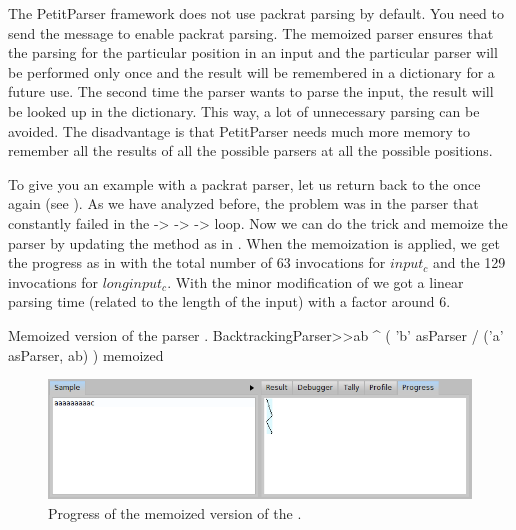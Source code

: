 \documentclass[a4paper,10pt,twoside]{book}
\begin{document}
The PetitParser framework does not use packrat parsing by default.
You need to send the  message to enable packrat parsing.
The memoized parser ensures that the parsing for the particular position in an input and the particular parser will be performed only once and the result will be remembered in a dictionary for a future use.
The second time the parser wants to parse the input, the result will be looked up in the dictionary.
This way, a lot of unnecessary parsing can be avoided.
The disadvantage is that PetitParser needs much more memory to remember all the results of all the possible parsers at all the possible positions.

To give you an example with a packrat parser, let us return back to the  once again (see ).
As we have analyzed before, the problem was in the parser  that constantly failed in the  ->  ->  ->  loop.
Now we can do the trick and memoize the parser  by updating the method  as in .
When the memoization is applied, we get the progress as in  with the total number of 63 invocations for $input_c$ and the 129 invocations for $longinput_c$.
With the minor modification of  we got a linear parsing time (related to the length of the input)  with a factor around 6.

\begin{script}{Memoized version of the parser . \label{scr:pp/backtrackingParser-memo}}
BacktrackingParser>>ab
  ^ ( 'b' asParser / 
	   ('a' asParser, ab)
     ) memoized
\end{script}

\begin{figure}
  \begin{center}
    \includegraphics[width=\linewidth]{example-progressAaac-memo}
    \caption{Progress of the memoized version of the . \label{fig:pp/example-progressAaac-memo}}
  \end{center}
\end{figure}
\end{document}
